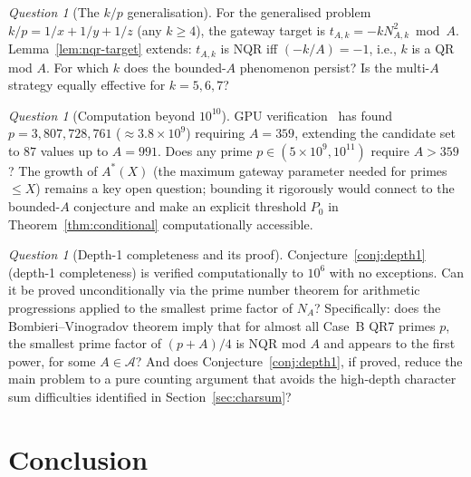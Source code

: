\documentclass[12pt]{amsart}
\theoremstyle{definition}
\theoremstyle{remark}
\newtheorem{question}[theorem]{Question}
\begin{document}
\begin{question}[The $k/p$ generalisation]\label{q:generalise}
For the generalised problem $k/p = 1/x + 1/y + 1/z$ (any $k \ge 4$),
the gateway target is $t_{A,k} = -k N_{A,k}^2 \bmod A$.
Lemma~\ref{lem:nqr-target} extends: $t_{A,k}$ is NQR iff $(-k/A) = -1$,
i.e., $k$ is a QR mod $A$.
For which $k$ does the bounded-$A$ phenomenon persist?
Is the multi-$A$ strategy equally effective for $k = 5, 6, 7$?
\end{question}

\begin{question}[Computation beyond $10^{10}$]\label{q:compute}
GPU verification~\cite{Gateway2026} has found $p = 3{,}807{,}728{,}761$
($\approx 3.8 \times 10^9$) requiring $A = 359$, extending the candidate
set to $87$ values up to $A = 991$.
Does any prime $p \in (5 \times 10^9, 10^{11})$ require $A > 359$?
The growth of $A^*(X)$ (the maximum gateway parameter needed for primes
$\le X$) remains a key open question; bounding it rigorously would
connect to the bounded-$A$ conjecture and make an explicit threshold
$P_0$ in Theorem~\ref{thm:conditional} computationally accessible.
\end{question}

\begin{question}[Depth-1 completeness and its proof]\label{q:depth1}
Conjecture~\ref{conj:depth1} (depth-1 completeness) is verified computationally
to $10^6$ with no exceptions.
Can it be proved unconditionally via the prime number theorem for
arithmetic progressions applied to the smallest prime factor of $N_A$?
Specifically: does the Bombieri--Vinogradov theorem imply that for almost all
Case~B QR7 primes $p$, the smallest prime factor of $(p + A)/4$
is NQR mod $A$ and appears to the first power, for some $A \in \mathcal{A}$?
And does Conjecture~\ref{conj:depth1}, if proved, reduce the main problem
to a pure counting argument that avoids the high-depth character sum difficulties
identified in Section~\ref{sec:charsum}?
\end{question}

\section{Conclusion}
\end{document}
